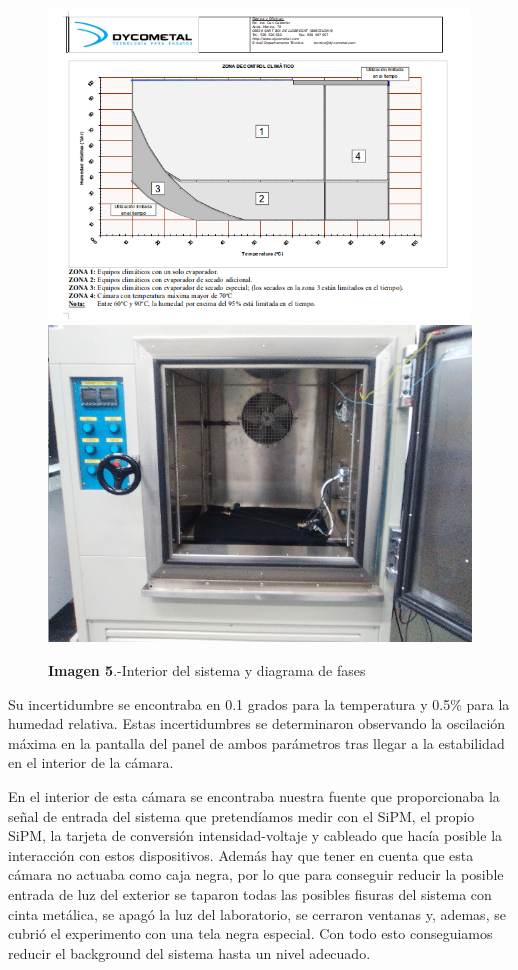 \begin{itemize}
\begin{figure}[htb]
\centering
{
\includegraphics[scale=0.15]{FichaTecnica.png} 
}
{
\includegraphics[scale=0.15]{InteriorTemperatura.png} 
}
\caption{\textbf{Imagen 5}.-Interior del sistema y diagrama de fases}
\end{figure}

Su incertidumbre se encontraba en 0.1 grados para la temperatura y 0.5\% para la humedad relativa. Estas incertidumbres se determinaron observando la oscilación  máxima en la pantalla del panel de ambos parámetros tras llegar a la estabilidad en el interior de la cámara.

En el interior de esta cámara se encontraba nuestra fuente que proporcionaba la señal de entrada del sistema que pretendíamos medir con el SiPM, el propio SiPM, la tarjeta de conversión intensidad-voltaje y cableado que hacía posible la interacción con estos dispositivos. Además hay que tener en cuenta que esta cámara no actuaba como caja negra, por lo que para conseguir reducir la posible entrada de luz del exterior se taparon todas las posibles fisuras del sistema con cinta metálica, se apagó la luz del laboratorio, se cerraron ventanas y, ademas, se cubrió el experimento con una tela negra especial. Con todo esto conseguiamos reducir el background del sistema hasta un nivel adecuado.


\end{itemize}
